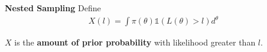 
\begin{frame}{\small{\textbf{Nested Sampling}}}
Define
\begin{align*}
	X(l) = \int \pi(\theta) \mathds{1}\left(L(\theta) > l\right)d^\theta
\end{align*}

$X$ is the {\bf amount of prior probability} with likelihood greater than $l$.
\end{frame}
